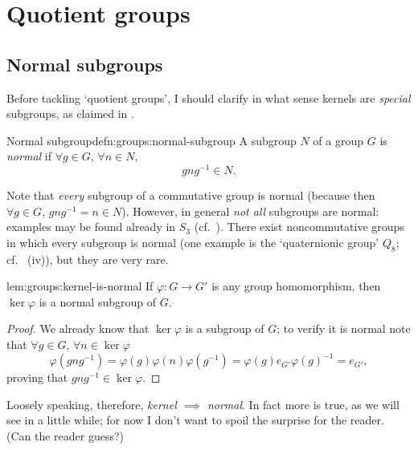 \section{Quotient groups}
\label{sec:groups:quotient-groups}


\subsection{Normal subgroups}
\label{subsec:groups:normal-subgroups}
Before tackling `quotient groups', I should clarify in what sense
kernels are \emph{special} subgroups, as claimed in
.

\begin{defn}{Normal subgroup}{defn:groups:normal-subgroup}
  A subgroup $N$ of a group $G$ is \emph{normal} if $\forall g \in G$,
  $\forall n \in N$,
  \[
    gng^{-1} \in N.
  \]
\end{defn}

Note that \emph{every} subgroup of a commutative group is normal
(because then $\forall g \in G$, $gng^{-1} = n \in N$). However, in
general \emph{not all} subgroups are normal: examples may be found
already in $S_3$ (cf.\ ). There
exist noncommutative groups in which every subgroup is normal (one
example is the `quaternionic group' $Q_8$; cf.\
 (iv)), but they are very rare.

\begin{lem}{}{lem:groups:kernel-is-normal}
  If $\varphi : G \to G'$ is any group homomorphism, then
    $\ker\varphi$ is a normal subgroup of
    $G$.
\end{lem}
\begin{proof}
  We already know that $\ker\varphi$ is a subgroup of $G$; to verify
  it is normal note that $\forall g \in G$,
  $\forall n \in \ker\varphi$
  \[
    \varphi(gng^{-1}) = \varphi(g)\varphi(n)\varphi(g^{-1}) =
    \varphi(g)e_{G'}\varphi(g)^{-1} = e_{G'},
  \]
  proving that $gng^{-1} \in \ker\varphi$.
\end{proof}

Loosely speaking, therefore, \emph{kernel $\implies$ normal}. In fact
more is true, as we will see in a little while; for now I don't want
to spoil the surprise for the reader. (Can the reader guess?)

